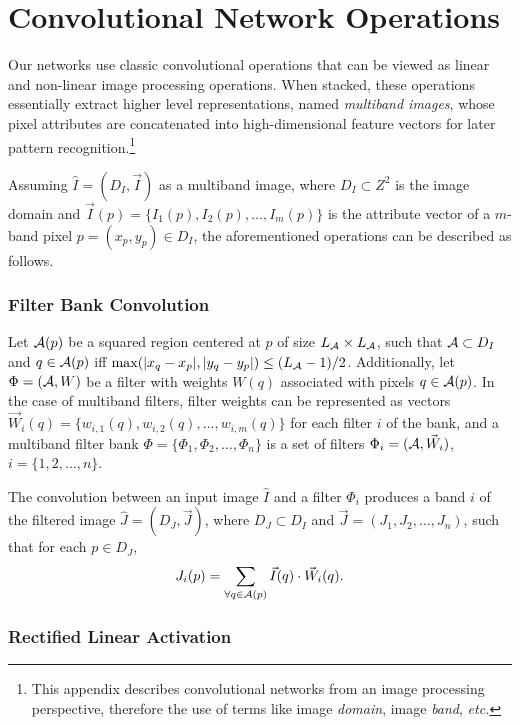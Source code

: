 \appendices

\section{Convolutional Network Operations}
\label{sec:convnet_ops}

Our networks use classic convolutional operations that can be viewed as linear and non-linear image processing operations. When stacked, these operations essentially extract higher level representations, named \emph{multiband images}, whose pixel attributes are concatenated into high-dimensional feature vectors for later pattern recognition.\footnote{This appendix describes convolutional networks from an image processing perspective, therefore the use of terms like image \emph{domain}, image \emph{band}, \emph{etc.}}

Assuming $\hat{I}=(D_I,\vec{I})$ as a multiband image, where $D_I \subset Z^2$ is the image domain and $\vec{I}(p)=\{I_1(p),I_2(p),\ldots, I_m(p)\}$ is the attribute vector of a $m$-band pixel $p=(x_p,y_p)\in D_I$, the aforementioned operations can be described as follows.

\subsubsection{Filter Bank Convolution}

Let ${\cal A}(p)$ be a squared region centered at $p$ of size $L_{\cal A} \times L_{\cal A}$, such that ${\cal A} \subset D_I$ and $q\in {\cal A}(p)$ iff $\max(|x_q-x_p|,|y_q-y_p|)\leq (L_{\cal A}-1)/2$.
Additionally, let $\Phi=({\cal A},W)$ be a filter with weights $W(q)$ associated with pixels $q\in {\cal A}(p)$.
In the case of multiband filters, filter weights can be represented as vectors $\vec{W}_i(q)=\{w_{i,1}(q),w_{i,2}(q),\ldots,w_{i,m}(q)\}$ for each filter $i$ of the bank, and a multiband filter bank $\Phi = \{\Phi_1, \Phi_2, \ldots, \Phi_n\}$ is a set of filters $\Phi_i=({\cal A},\vec{W}_i)$, $i=\{1,2,\ldots,n\}$.

The convolution between an input image $\hat{I}$ and a filter $\Phi_i$ produces a band $i$ of the filtered image $\hat{J}=(D_J,\vec{J})$, where $D_J \subset D_I$ and $\vec{J}=(J_1,J_2,\ldots,J_n)$, such that for each $p\in D_J$,
\begin{equation}
J_i(p) = \sum_{\forall q\in {\cal A}(p)} \vec{I}(q)\cdot \vec{W}_i(q).
\end{equation}

\subsubsection{Rectified Linear Activation}

